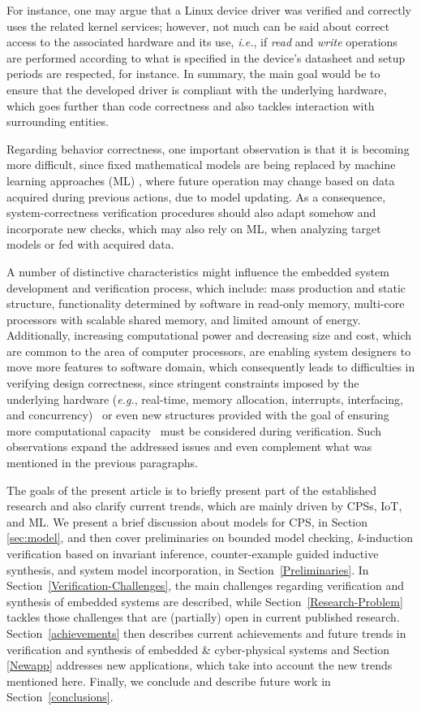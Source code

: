 \documentclass[format=acmsmall, review=false, screen=true]{acmart}
\begin{document}
For instance, one may argue that a Linux device driver \cite{ldd} was verified and correctly uses the related kernel services; however, not much can be said about correct access to the associated hardware and its use, {\it i.e.}, if \textit{read} and \textit{write} operations are performed according to what is specified in the device's datasheet and setup periods are respected, for instance. In summary, the main goal would be to ensure that the developed driver is compliant with the underlying hardware, which goes further than code correctness and also tackles interaction with surrounding entities.

Regarding behavior correctness, one important observation is that it is becoming more difficult, since fixed mathematical models are being replaced by machine learning approaches (ML) \cite{mlembe}, where future operation may change based on data acquired during previous actions, due to model updating. As a consequence, system-correctness verification procedures should also adapt somehow and incorporate new checks, which may also rely on ML, when analyzing target models or fed with acquired data.

A number of distinctive characteristics might influence the embedded system development and verification process, which include: mass production and static structure, functionality determined by software in read-only memory, multi-core processors with scalable shared memory, and limited amount of energy. Additionally, increasing computational power and decreasing size and cost, which are common to the area of computer processors, are enabling system designers to move more features to software domain, which consequently leads to difficulties in verifying design correctness, since stringent constraints imposed by the underlying hardware ({\it e.g.}, real-time, memory allocation, interrupts, interfacing, and concurrency)~\cite{Kroening15} or even new structures provided with the goal of ensuring more computational capacity~\cite{cudalucas} must be considered during verification. Such observations expand the addressed issues and even complement what was mentioned in the previous paragraphs.

The goals of the present article is to briefly present part of the established research and also clarify current trends, which are mainly driven by CPSs, IoT, and ML. We present a brief discussion about models for CPS, in Section \ref{sec:model}, and then cover preliminaries on bounded model checking, \textit{k}-induction verification based on invariant inference, counter-example guided inductive synthesis, and system model incorporation, in Section~\ref{Preliminaries}. In Section~\ref{Verification-Challenges}, the main challenges regarding verification and synthesis of embedded systems are described, while Section~\ref{Research-Problem} tackles those challenges that are (partially) open in current published research. Section~\ref{achievements} then describes current achievements and future trends in verification and synthesis of embedded \& cyber-physical systems and Section \ref{Newapp} addresses new applications, which take into account the new trends mentioned here. Finally, we conclude and describe future work in Section~\ref{conclusions}.
\end{document}
